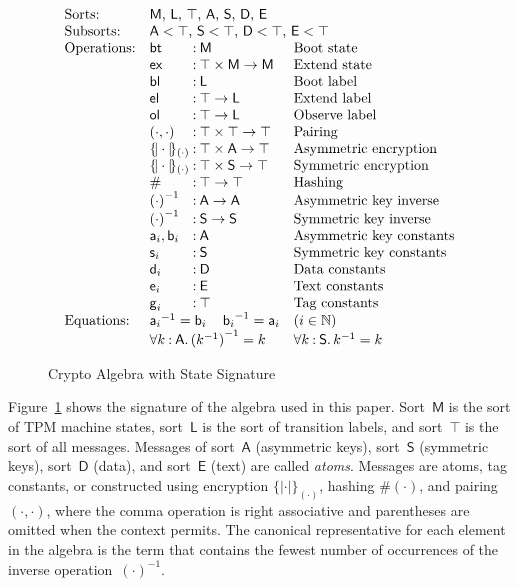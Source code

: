 \documentclass[12pt]{article}
\newcommand{\cn}[1]{\ensuremath{\operatorname{\mathsf{#1}}}}
\newcommand{\srt}[1]{\ensuremath{\mathsf{#1}}}
\newcommand{\typ}{\mathbin:}
\newcommand{\enc}[2]{\ensuremath{\{\!|#1|\!\}_{#2}}}
\newcommand{\invk}[1]{{#1}^{-1}}
\newcommand{\tg}[1]{\cn{g}_{#1}}
\newcommand{\nat}{\ensuremath{\mathbb{N}}}
\newcommand{\all}[1]{\forall#1\mathpunct.}
\newcommand{\boot}{\cn{bt}}
\newcommand{\extend}{\cn{ex}}
\newcommand{\bootl}{\cn{bl}}
\newcommand{\extendl}{\cn{el}}
\newcommand{\observl}{\cn{ol}}
\begin{document}
\begin{figure}
$$\begin{array}{ll@{{}\typ{}}ll}
\mbox{Sorts:}&
\multicolumn{3}{l}{\mbox{\srt{M}, \srt{L}, $\top$, $\srt{A}$,
    $\srt{S}$, $\srt{D}$, $\srt{E}$}}\\
\mbox{Subsorts:}&
\multicolumn{3}{l}{\mbox{$\srt{A}<\top$, $\srt{S}<\top$,
    $\srt{D}<\top$, $\srt{E}<\top$}}\\
\mbox{Operations:}&\boot&\srt{M}&\mbox{Boot state}\\
&\extend&\top\times\srt{M}\to\srt{M}&\mbox{Extend state}\\
&\bootl&\srt{L}&\mbox{Boot label}\\
&\extendl&\srt{\top}\to\srt{L}&\mbox{Extend label}\\
&\observl&\srt{\top}\to\srt{L}&\mbox{Observe label}\\
&(\cdot,\cdot)&\top\times\top\to\top& \mbox{Pairing}\\
&\enc{\cdot}{(\cdot)}&\top\times\srt{A}\to\top&\mbox{Asymmetric encryption}\\
&\enc{\cdot}{(\cdot)}&\top\times\srt{S}\to\top&\mbox{Symmetric encryption}\\
&\#&\srt{\top}\to\top& \mbox{Hashing}\\
&\invk{(\cdot)}&\srt{A}\to\srt{A}& \mbox{Asymmetric key inverse}\\
&\invk{(\cdot)}&\srt{S}\to\srt{S}& \mbox{Symmetric key inverse}\\
&\cn{a}_i,\cn{b}_i&\srt{A}& \mbox{Asymmetric key constants}\\
&\cn{s}_i&\srt{S}& \mbox{Symmetric key constants}\\
&\cn{d}_i&\srt{D}& \mbox{Data constants}\\
&\cn{e}_i&\srt{E}& \mbox{Text constants}\\
&\tg{i}&\top& \mbox{Tag constants}\\
\mbox{Equations:}&\multicolumn{2}{l}{\invk{\cn{a}_i}=\cn{b}_i\quad
\invk{\cn{b}_i}=\cn{a}_i}
&(i\in\nat)\\
&\multicolumn{2}{l}{\all{k\typ\srt{A}}\invk{(\invk{k})}=k}
&\all{k\typ\srt{S}}\invk{k}=k
\end{array}$$
\caption{Crypto Algebra with State Signature}\label{fig:signature}
\end{figure}

Figure~\ref{fig:signature} shows the signature of the algebra used in
this paper.  Sort~\srt{M} is the sort of TPM machine states,
sort~\srt{L} is the sort of transition labels, and sort~$\top$ is the
sort of all messages.  Messages of sort~$\srt{A}$ (asymmetric keys),
sort~$\srt{S}$ (symmetric keys), sort~$\srt{D}$ (data), and
sort~$\srt{E}$ (text) are called \emph{atoms}.  Messages are atoms,
tag constants, or constructed using encryption $\enc{\cdot}{(\cdot)}$,
hashing $\#(\cdot)$, and pairing $(\cdot,\cdot)$, where the comma
operation is right associative and parentheses are omitted when the
context permits.  The canonical representative for each element in the
algebra is the term that contains the fewest number of occurrences of
the inverse operation~$\invk{(\cdot)}$.
\end{document}
